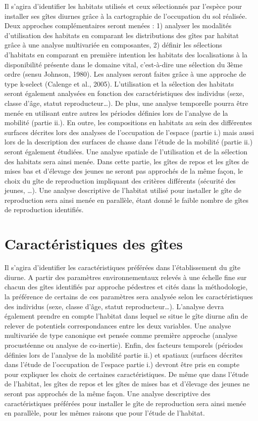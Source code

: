 \documentclass[
  letterpaper,
  DIV=11,
  numbers=noendperiod]{scrreprt}
\begin{document}
Il s'agira d'identifier les habitats utilisés et ceux sélectionnés par
l'espèce pour installer ses gîtes diurnes grâce à la cartographie de
l'occupation du sol réalisée. Deux approches complémentaires seront
menées : 1) analyser les modalités d'utilisation des habitats en
comparant les distributions des gîtes par habitat grâce à une analyse
multivariée en composantes, 2) définir les sélections d'habitats en
comparant en première intention les habitats des localisations à la
disponibilité présente dans le domaine vital, c'est-à-dire une sélection
du 3ème ordre (sensu Johnson, 1980). Les analyses seront faites grâce à
une approche de type k-select (Calenge et al., 2005). L'utilisation et
la sélection des habitats seront également analysées en fonction des
caractéristiques des individus (sexe, classe d'âge, statut
reproducteur\ldots). De plus, une analyse temporelle pourra être menée
en utilisant entre autres les périodes définies lors de l'analyse de la
mobilité (partie ii.). En outre, les compositions en habitats au sein
des différentes surfaces décrites lors des analyses de l'occupation de
l'espace (partie i.) mais aussi lors de la description des surfaces de
chasse dans l'étude de la mobilité (partie ii.) seront également
étudiées. Une analyse spatiale de l'utilisation et de la sélection des
habitats sera ainsi menée. Dans cette partie, les gîtes de repos et les
gîtes de mises bas et d'élevage des jeunes ne seront pas approchés de la
même façon, le choix du gîte de reproduction impliquant des critères
différents (sécurité des jeunes, \ldots). Une analyse descriptive de
l'habitat utilisé pour installer le gîte de reproduction sera ainsi
menée en parallèle, étant donné le faible nombre de gîtes de
reproduction identifiés.

\section{Caractéristiques des
gîtes}\label{caractuxe9ristiques-des-guxeetes}

Il s'agira d'identifier les caractéristiques préférées dans
l'établissement du gîte diurne. A partir des paramètres environnementaux
relevés à une échelle fine sur chacun des gîtes identifiés par approche
pédestres et cités dans la méthodologie, la préférence de certains de
ces paramètres sera analysée selon les caractéristiques des individus
(sexe, classe d'âge, statut reproducteur\ldots). L'analyse devra
également prendre en compte l'habitat dans lequel se situe le gîte
diurne afin de relever de potentiels correspondances entre les deux
variables. Une analyse multivariée de type canonique est pensée comme
première approche (analyse procustéenne ou analyse de co-inertie).
Enfin, des facteurs temporels (périodes définies lors de l'analyse de la
mobilité partie ii.) et spatiaux (surfaces décrites dans l'étude de
l'occupation de l'espace partie i.) devront être pris en compte pour
expliquer les choix de certaines caractéristiques. De même que dans
l'étude de l'habitat, les gîtes de repos et les gîtes de mises bas et
d'élevage des jeunes ne seront pas approchés de la même façon. Une
analyse descriptive des caractéristiques préférées pour installer le
gîte de reproduction sera ainsi menée en parallèle, pour les mêmes
raisons que pour l'étude de l'habitat.
\end{document}
